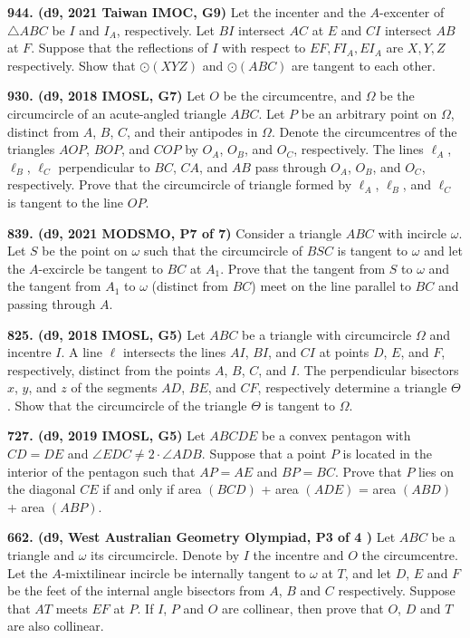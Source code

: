 \documentclass{article}
\begin{document}
\textbf{944. (\color{red}d9\color{black}, 2021 Taiwan IMOC, G9)} Let the incenter and the $A$-excenter of $\triangle ABC$ be $I$ and $I_A$, respectively. Let $BI$ intersect $AC$ at $E$ and $CI$ intersect $AB$ at $F$. Suppose that the reflections of $I$ with respect to $EF, FI_A, EI_A$ are $X, Y, Z$ respectively. Show that $\odot (XYZ)$ and $\odot (ABC)$ are tangent to each other.

\textbf{930. (\color{red}d9\color{black}, 2018 IMOSL, G7)} Let $O$ be the circumcentre, and $\Omega$ be the circumcircle of an acute-angled triangle $ABC$. Let $P$ be an arbitrary point on $\Omega$, distinct from $A$, $B$, $C$, and their antipodes in $\Omega$. Denote the circumcentres of the triangles $AOP$, $BOP$, and $COP$ by $O_A$, $O_B$, and $O_C$, respectively. The lines $\ell_A$, $\ell_B$, $\ell_C$ perpendicular to $BC$, $CA$, and $AB$ pass through $O_A$, $O_B$, and $O_C$, respectively. Prove that the circumcircle of triangle formed by $\ell_A$, $\ell_B$, and $\ell_C$ is tangent to the line $OP$.

\textbf{839. (\color{red}d9\color{black}, 2021 MODSMO, P7 of 7)} Consider a triangle $ABC$ with incircle $\omega$. Let $S$ be the point on $\omega$ such that the circumcircle of $BSC$ is tangent to $\omega$ and let the $A$-excircle be tangent to $BC$ at $A_1$. Prove that the tangent from $S$ to $\omega$ and the tangent from $A_1$ to $\omega$ (distinct from $BC$) meet on the line parallel to $BC$ and passing through $A$.

\textbf{825. (\color{red}d9\color{black}, 2018 IMOSL, G5)} Let $ABC$ be a triangle with circumcircle $\Omega$ and incentre $I$. A line $\ell$ intersects the lines $AI$, $BI$, and $CI$ at points $D$, $E$, and $F$, respectively, distinct from the points $A$, $B$, $C$, and $I$. The perpendicular bisectors $x$, $y$, and $z$ of the segments $AD$, $BE$, and $CF$, respectively determine a triangle $\Theta$. Show that the circumcircle of the triangle $\Theta$ is tangent to $\Omega$.

\textbf{727. (\color{red}d9\color{black}, 2019 IMOSL, G5)} Let $ABCDE$ be a convex pentagon with $CD= DE$ and $\angle EDC \ne 2 \cdot \angle ADB$.
Suppose that a point $P$ is located in the interior of the pentagon such that $AP =AE$ and $BP= BC$.
Prove that $P$ lies on the diagonal $CE$ if and only if area $(BCD)$ + area $(ADE)$ = area $(ABD)$ + area $(ABP)$.

\textbf{662. (\color{red}d9\color{black}, West Australian Geometry Olympiad, P3 of 4 )} Let $ABC$ be a triangle and $\omega$ its circumcircle. Denote by $I$ the incentre and $O$ the circumcentre. Let the $A$-mixtilinear incircle be internally tangent to $\omega$ at $T$, and let $D$, $E$ and $F$ be the feet of the internal angle bisectors from $A$, $B$ and $C$ respectively. Suppose that $AT$ meets $EF$ at $P$. If $I$, $P$ and $O$ are collinear, then prove that $O$, $D$ and $T$ are also collinear.
\end{document}
